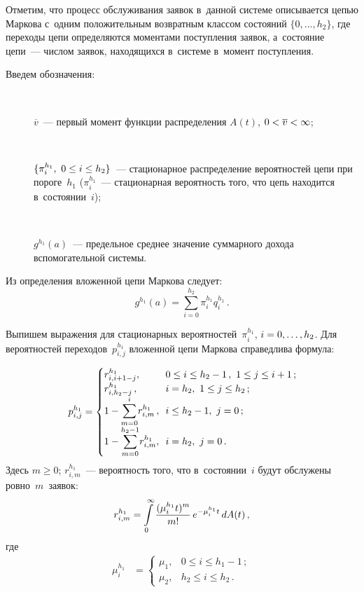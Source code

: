 \begin{multicols}{2}
  Отметим, что процесс обслуживания заявок в~данной сис\-те\-ме описывается 
цепью Маркова с~одним положительным возвратным классом со\-сто\-яний $\{0, 
\ldots , h_2\}$, где переходы цепи определяются моментами поступления 
заявок, а~состояние цепи~--- числом заявок, находящихся в~сис\-те\-ме в~момент 
поступления. 
  
  Введем обозначения:
  \begin{description}
  \item[\,] $\overline{v}$~--- первый момент функции распределения $A(t)$, 
$0\hm<\overline{v}\hm< \infty$;
  \item[\,]  $\{\pi_i^{h_1}, \ 0\hm\leq i\hm\leq h_2\}$~--- стационарное 
распределение вероятностей цепи при пороге~$h_1$ ($\pi_i^{h_1}$~--- 
стационарная вероятность того, что цепь находится в~состоянии~$i$);
  \item[\,]  $g^{h_1}(a)$~--- предельное среднее значение суммарного дохода 
вспомогательной сис\-темы.
  \end{description}
  
Из определения вложенной цепи Маркова следует:
\begin{equation}
g^{h_1}(a)=\sum\limits_{i=0}^{h_2} \pi_i^{h_1} q_i^{h_1}\,.
\label{e2-aga}
\end{equation}
  
  Выпишем выражения для стационарных вероятностей~$\pi_i^{h_1}$, $i\hm= 
0,\ldots , h_2$. Для вероятностей  переходов~$p^{h_1}_{i,j}$ вложенной цепи 
Маркова справедлива формула:

\noindent
  $$
  p_{i,j}^{h_1}= 
  \begin{cases}
  r^{h_1}_{i,i+1-j}, &\!\!0\leq i\leq h_2-1\,,\ 1\leq j\leq i+1\,;\\
  r^{h_1}_{i,h_2-j}\,, &\!\! i=h_2,\ 1\leq j\leq h_2\,;\\
  1-\displaystyle \sum\limits^i_{m=0} \!r^{h_1}_{i,m}\,, &\!\! i\leq h_2-1,\ j=0\,;\\
  1-\displaystyle \sum\limits_{m=0}^{h_2-1}\!r^{h_1}_{i,m}, &\!\! i=h_2,\ j=0\,.
  \end{cases}
  \hspace*{-2.05016pt}
  $$
Здесь $m\geq 0$; $r^{h_1}_{i,m}$~--- вероятность того, что в~состоянии~$i$ будут 
обслужены ровно~$m$~заявок:
\begin{equation*}
r^{h_1}_{i,m} = \int\limits_0^\infty \displaystyle\frac{\displaystyle (\mu_i^{h_1}t)^m\mathstrut}{\displaystyle m!\mathstrut}\,e^{-
\mu_i^{h_1} t}\,dA(t)\,,
\end{equation*}
где
\begin{align*}
\mu_i^{h_1} &= \begin{cases}
\mu_1, &  0\leq i\leq h_1-1\,;\\
\mu_2, & h_2\leq i\leq h_2\,.
\end{cases}
\end{align*}
  

\end{multicols}
